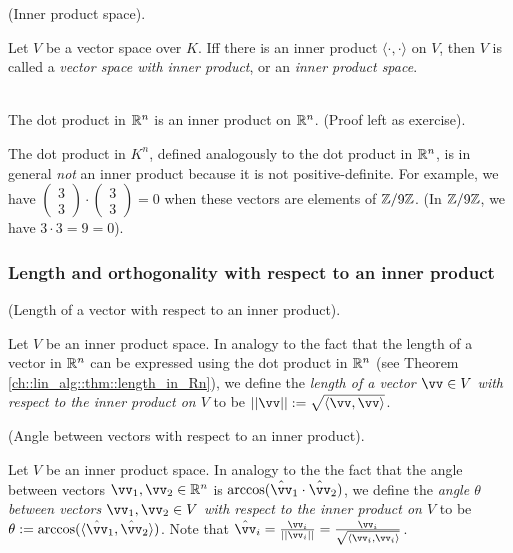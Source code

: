 \begin{defn}
    (Inner product space).
    
    Let $V$ be a vector space over $K$. Iff there is an inner product $\langle \cdot, \cdot \rangle$ on $V$, then $V$ is called a \textit{vector space with inner product}, or an \textit{inner product space}.
\end{defn}

\begin{example}
    \mbox{} \\ \indent
    The dot product in $\mathbb{R}^n$ is an inner product on $\mathbb{R}^n$. (Proof left as exercise). 
    
    The dot product in $K^n$, defined analogously to the dot product in $\mathbb{R}^n$, is in general \textit{not} an inner product because it is not positive-definite. For example, we have $\begin{pmatrix} 3 \\ 3 \end{pmatrix} \cdot \begin{pmatrix} 3 \\ 3 \end{pmatrix} = 0$ when these vectors are elements of $\mathbb{Z}/9\mathbb{Z}$. (In $\mathbb{Z}/9\mathbb{Z}$, we have $3 \cdot 3 = 9 = 0$).
\end{example}

\subsubsection*{Length and orthogonality with respect to an inner product}

\begin{defn}
    (Length of a vector with respect to an inner product). 
    
    Let $V$ be an inner product space. In analogy to the fact that the length of a vector in $\mathbb{R}^n$ can be expressed using the dot product in $\mathbb{R}^n$ (see Theorem \ref{ch::lin_alg::thm::length_in_Rn}), we define the \textit{length of a vector $\vv \in V$ with respect to the inner product on $V$} to be $||\vv|| := \sqrt{\langle \vv, \vv \rangle}$.
\end{defn}

\begin{defn}
    (Angle between vectors with respect to an inner product). 
    
    Let $V$ be an inner product space. In analogy to the the fact that the angle between vectors $\vv_1, \vv_2 \in \R^n$ is $\arccos(\hat{\vv}_1 \cdot \hat{\vv}_2)$, we define the \textit{angle $\theta$ between vectors $\vv_1, \vv_2 \in V$ with respect to the inner product on $V$} to be $\theta := \arccos(\langle \hat{\vv}_1, \hat{\vv}_2 \rangle)$. Note that $\hat{\vv}_i = \frac{\vv_i}{||\vv_i||} = \frac{\vv_i}{\sqrt{\langle \vv_i, \vv_i \rangle}}$.
\end{defn}

